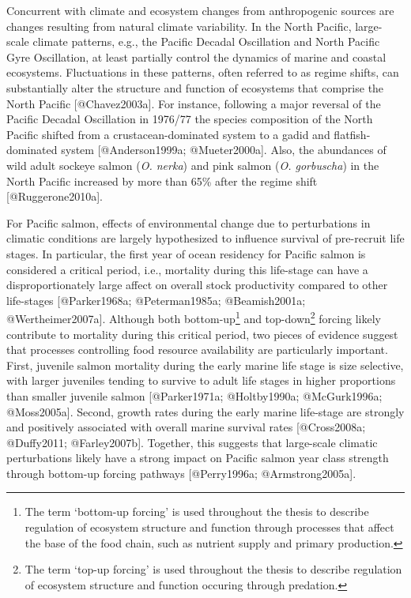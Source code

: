 Concurrent with climate and ecosystem changes from anthropogenic sources
are changes resulting from natural climate variability. In the North
Pacific, large-scale climate patterns, e.g., the Pacific Decadal
Oscillation and North Pacific Gyre Oscillation, at least partially
control the dynamics of marine and coastal ecosystems. Fluctuations in
these patterns, often referred to as regime shifts, can substantially
alter the structure and function of ecosystems that comprise the North
Pacific {[}@Chavez2003a{]}. For instance, following a major reversal of
the Pacific Decadal Oscillation in 1976/77 the species composition of
the North Pacific shifted from a crustacean-dominated system to a gadid
and flatfish-dominated system {[}@Anderson1999a; @Mueter2000a{]}. Also,
the abundances of wild adult sockeye salmon (\emph{O. nerka}) and pink
salmon (\emph{O. gorbuscha}) in the North Pacific increased by more than
65\% after the regime shift {[}@Ruggerone2010a{]}.

For Pacific salmon, effects of environmental change due to perturbations
in climatic conditions are largely hypothesized to influence survival of
pre-recruit life stages. In particular, the first year of ocean
residency for Pacific salmon is considered a critical period, i.e.,
mortality during this life-stage can have a disproportionately large
affect on overall stock productivity compared to other life-stages
{[}@Parker1968a; @Peterman1985a; @Beamish2001a; @Wertheimer2007a{]}.
Although both bottom-up\footnote{The term `bottom-up forcing' is used
  throughout the thesis to describe regulation of ecosystem structure
  and function through processes that affect the base of the food chain,
  such as nutrient supply and primary production.} and
top-down\footnote{The term `top-up forcing' is used throughout the
  thesis to describe regulation of ecosystem structure and function
  occuring through predation.} forcing likely contribute to mortality
during this critical period, two pieces of evidence suggest that
processes controlling food resource availability are particularly
important. First, juvenile salmon mortality during the early marine life
stage is size selective, with larger juveniles tending to survive to
adult life stages in higher proportions than smaller juvenile salmon
{[}@Parker1971a; @Holtby1990a; @McGurk1996a; @Moss2005a{]}. Second,
growth rates during the early marine life-stage are strongly and
positively associated with overall marine survival rates {[}@Cross2008a;
@Duffy2011; @Farley2007b{]}. Together, this suggests that large-scale
climatic perturbations likely have a strong impact on Pacific salmon
year class strength through bottom-up forcing pathways {[}@Perry1996a;
@Armstrong2005a{]}.

